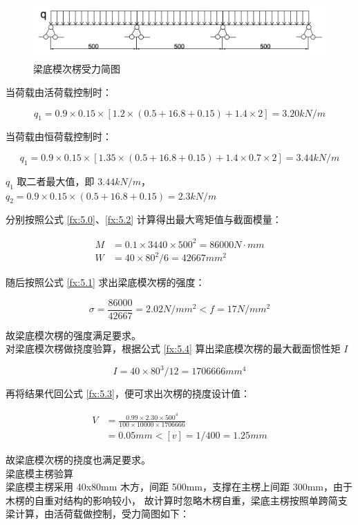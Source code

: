 \begin{figure}[thbp!]
    \centering
    \includegraphics[width=1.0\linewidth]{figure/c5f2.png}
    \caption{梁底模次楞受力简图}
    \label{fig:c5f2c}
\end{figure}

当荷载由活荷载控制时：

\[q_1=0.9\times 0.15\times [1.2\times (0.5+16.8+0.15)+1.4\times 2]=3.20 kN/m\]

当荷载由恒荷载控制时：

\[q_1=0.9\times 0.15\times [1.35\times (0.5+16.8+0.15)+1.4\times0.7\times 2]=3.44 kN/m\]

$q_1$ 取二者最大值，即 $3.44 kN/m$，$q_2=0.9\times 0.15\times (0.5+16.8+0.15)=2.3 kN/m$

分别按照公式 \ref{fx:5.0}、\ref{fx:5.2} 计算得出最大弯矩值与截面模量：

\begin{align*}
    M&=0.1\times 3440\times 500^2=86000 N \cdot mm\\
    W&=40\times 80^2 /6=42667 mm^2
\end{align*}

随后按照公式 \ref{fx:5.1} 求出梁底模次楞的强度：

\[
    \sigma = \frac{86000}{42667}=2.02 N/mm^2< f=17N/mm^2
\]

故梁底模次楞的强度满足要求。\\

对梁底模次楞做挠度验算，根据公式 \ref{fx:5.4} 算出梁底模次楞的最大截面惯性矩 $I$

\[
    I=40\times 80^3 /12=1706666 mm^4
\]

再将结果代回公式 \ref{fx:5.3}，便可求出次楞的挠度设计值：

\begin{align*}
    V&=\frac{0.99\times 2.30 \times 500^4}{100\times 10000\times 1706666}\\
    &=0.05 mm<[v]=1/400=1.25mm
\end{align*}

故梁底模次楞的挠度也满足要求。\\

 梁底模主楞验算\\

梁底模主楞采用 40x80mm 木方，间距 500mm，支撑在主楞上间距 300mm，由于木楞的自重对结构的影响较小，
故计算时忽略木楞自重，梁底主楞按照单跨简支梁计算，由活荷载做控制，受力简图如下：

